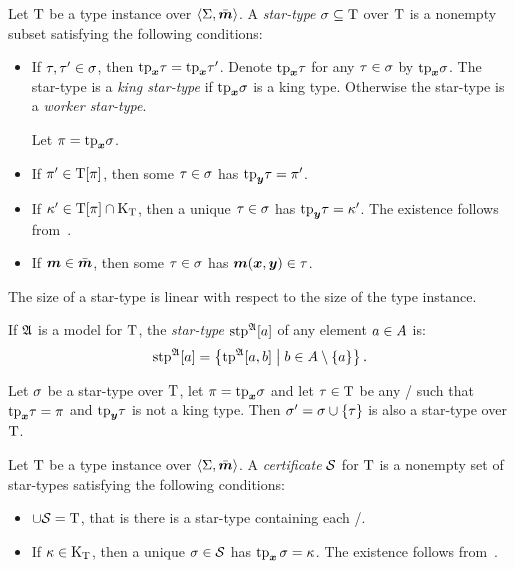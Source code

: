 \begin{definition}
Let $\mathrm{T}$ be a type instance over $\left\langle \mathrm{\Sigma},\bar{\bm{m}} \right\rangle$.
A \emph{star-type} $\sigma \subseteq \mathrm{T}$ over $\mathrm{T}$ is a nonempty
subset satisfying the following conditions:
\begin{itemize}
  \item[\condstpx]\label{cond:stpx}
  If $\tau, {\tau'} \in \sigma$, then $\mathrm{tp}_{\bm{x}}\tau = \mathrm{tp}_{\bm{x}}{\tau'}$.
  Denote $\mathrm{tp}_{\bm{x}}\tau$ for any $\tau \in \sigma$ by $\mathrm{tp}_{\bm{x}}\sigma$.
  The star-type is a \emph{king star-type} if $\mathrm{tp}_{\bm{x}}\sigma$ is a king type.
  Otherwise the star-type is a \emph{worker star-type}.
  
  Let $\pi=\mathrm{tp}_{\bm{x}}\sigma$.
  
  \item[\condstppy]\label{cond:stppy}
  If ${\pi'} \in \mathrm{T}[\pi]$, then some $\tau\in\sigma$ has
  $\mathrm{tp}_{\bm{y}}\tau = {\pi'}$.
  
  \item[\condstpky]\label{cond:stpky}
  If ${\kappa'} \in \mathrm{T}[\pi]\cap{\mathrm{K}}_{\mathrm{T}}$, then a unique $\tau\in\sigma$ has
  $\mathrm{tp}_{\bm{y}}\tau = {\kappa'}$. The existence follows from~.
  
  \item[\condstpm]\label{cond:stpm}
  If $\bm{m} \in \bar{\bm{m}}$, then some $\tau\in\sigma$ has $\bm{m}(\bm{x},\bm{y}) \in \tau$.
\end{itemize}
The size of a star-type is linear with respect to the size of the type instance.
\end{definition}

If $\mathfrak{A}$ is a model for $\mathrm{T}$, the \emph{star-type}
$\operatorname{stp}^{\mathfrak{A}}[a]$ of any element $a \in A$ is:
\[
  \operatorname{stp}^{\mathfrak{A}}[a] = \left\{\operatorname{tp}^{\mathfrak{A}}[a,b]\mathrel{}\middle|\mathrel{}b \in A \setminus \left\{a\right\}\right\}.
\]

\begin{remark}\label{rem:star-type-ext}
Let $\sigma$ be a star-type over $\mathrm{T}$, let $\pi = \mathrm{tp}_{\bm{x}}\sigma$ and let
$\tau \in \mathrm{T}$ be any \twotype/ such that $\mathrm{tp}_{\bm{x}}\tau = \pi$ and
$\mathrm{tp}_{\bm{y}}\tau$ is not a king type.
Then ${\sigma'} = \sigma \cup \left\{\tau\right\}$ is also a star-type over $\mathrm{T}$.
\end{remark}

\begin{definition}
Let $\mathrm{T}$ be a type instance over $\left\langle \mathrm{\Sigma},\bar{\bm{m}} \right\rangle$.
A \emph{certificate} $\mathcal{S}$ for $\mathrm{T}$ is a nonempty set of star-types
satisfying the following conditions:
\begin{itemize}
  \item[\condcertT]\label{cond:certT}
  $\cup\mathcal{S} = \mathrm{T}$, that is there is a star-type containing each \twotype/.
  
  \item[\condcertk]\label{cond:certk}
  If $\kappa \in {\mathrm{K}}_{\mathrm{T}}$, then a unique $\sigma\in\mathcal{S}$ has $\operatorname{tp}_{\bm{x}}\sigma = \kappa$.
  The existence follows from~.
\end{itemize}
\end{definition}

